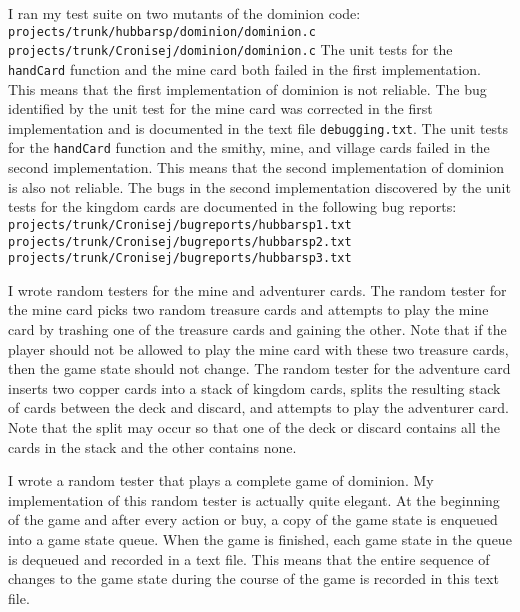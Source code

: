 \documentclass[10pt,letterpaper,notitlepage,draft]{article}
\begin{document}
I ran my test suite on two mutants of the dominion code:
\newline
\texttt{projects/trunk/hubbarsp/dominion/dominion.c}
\newline
\texttt{projects/trunk/Cronisej/dominion/dominion.c}
\newline
The unit tests for the \texttt{handCard} function and the mine card both failed in the first implementation.
This means that the first implementation of dominion is not reliable.
The bug identified by the unit test for the mine card was corrected in the first implementation and is documented in the text file \texttt{debugging.txt}.
The unit tests for the \texttt{handCard} function and the smithy, mine, and village cards failed in the second implementation.
This means that the second implementation of dominion is also not reliable.
The bugs in the second implementation discovered by the unit tests for the kingdom cards are documented in the following bug reports:
\newline
\texttt{projects/trunk/Cronisej/bugreports/hubbarsp1.txt}
\newline
\texttt{projects/trunk/Cronisej/bugreports/hubbarsp2.txt}
\newline
\texttt{projects/trunk/Cronisej/bugreports/hubbarsp3.txt}

I wrote random testers for the mine and adventurer cards.
The random tester for the mine card picks two random treasure cards and attempts to play the mine card by trashing one of the treasure cards and gaining the other.
Note that if the player should not be allowed to play the mine card with these two treasure cards, then the game state should not change.
The random tester for the adventure card inserts two copper cards into a stack of kingdom cards, splits the resulting stack of cards between the deck and discard, and attempts to play the adventurer card.
Note that the split may occur so that one of the deck or discard contains all the cards in the stack and the other contains none.

I wrote a random tester that plays a complete game of dominion.
My implementation of this random tester is actually quite elegant.
At the beginning of the game and after every action or buy, a copy of the game state is enqueued into a game state queue.
When the game is finished, each game state in the queue is dequeued and recorded in a text file.
This means that the entire sequence of changes to the game state during the course of the game is recorded in this text file.
\end{document}
